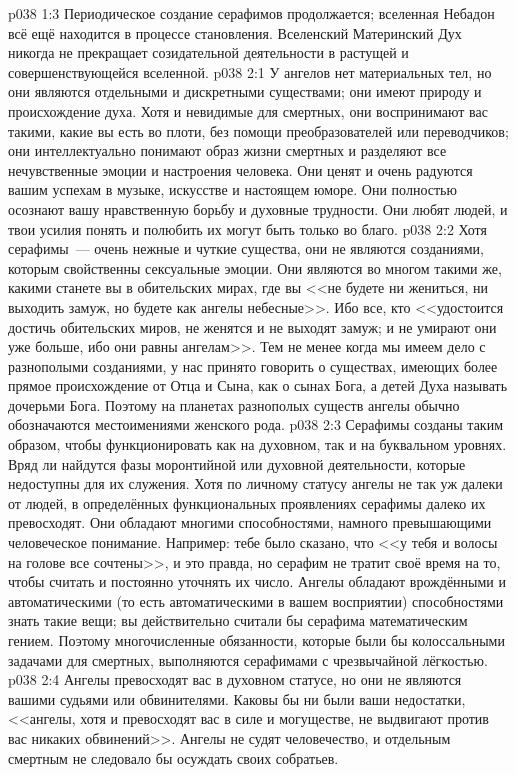 \vs p038 1:3 Периодическое создание серафимов продолжается; вселенная Небадон всё ещё находится в процессе становления. Вселенский Материнский Дух никогда не прекращает созидательной деятельности в растущей и совершенствующейся вселенной.
\vs p038 2:1 У ангелов нет материальных тел, но они являются отдельными и дискретными существами; они имеют природу и происхождение духа. Хотя и невидимые для смертных, они воспринимают вас такими, какие вы есть во плоти, без помощи преобразователей или переводчиков; они интеллектуально понимают образ жизни смертных и разделяют все нечувственные эмоции и настроения человека. Они ценят и очень радуются вашим успехам в музыке, искусстве и настоящем юморе. Они полностью осознают вашу нравственную борьбу и духовные трудности. Они любят людей, и твои усилия понять и полюбить их могут быть только во благо.
\vs p038 2:2 \pc Хотя серафимы~--- очень нежные и чуткие существа, они не являются созданиями, которым свойственны сексуальные эмоции. Они являются во многом такими же, какими станете вы в обительских мирах, где вы <<не будете ни жениться, ни выходить замуж, но будете как ангелы небесные>>. Ибо все, кто <<удостоится достичь обительских миров, не женятся и не выходят замуж; и не умирают они уже больше, ибо они равны ангелам>>. Тем не менее когда мы имеем дело с разнополыми созданиями, у нас принято говорить о существах, имеющих более прямое происхождение от Отца и Сына, как о сынах Бога, а детей Духа называть дочерьми Бога. Поэтому на планетах разнополых существ ангелы обычно обозначаются местоимениями женского рода.
\vs p038 2:3 Серафимы созданы таким образом, чтобы функционировать как на духовном, так и на буквальном уровнях. Вряд ли найдутся фазы моронтийной или духовной деятельности, которые недоступны для их служения. Хотя по личному статусу ангелы не так уж далеки от людей, в определённых функциональных проявлениях серафимы далеко их превосходят. Они обладают многими способностями, намного превышающими человеческое понимание. Например: тебе было сказано, что <<у тебя и волосы на голове все сочтены>>, и это правда, но серафим не тратит своё время на то, чтобы считать и постоянно уточнять их число. Ангелы обладают врождёнными и автоматическими (то есть автоматическими в вашем восприятии) способностями знать такие вещи; вы действительно считали бы серафима математическим гением. Поэтому многочисленные обязанности, которые были бы колоссальными задачами для смертных, выполняются серафимами с чрезвычайной лёгкостью.
\vs p038 2:4 \pc Ангелы превосходят вас в духовном статусе, но они не являются вашими судьями или обвинителями. Каковы бы ни были ваши недостатки, <<ангелы, хотя и превосходят вас в силе и могуществе, не выдвигают против вас никаких обвинений>>. Ангелы не судят человечество, и отдельным смертным не следовало бы осуждать своих собратьев.
